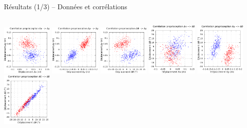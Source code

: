 \begin{frame}{Résultats (1/3) -- Données et corrélations}
\begin{columns}
\begin{column}{0.65\linewidth}
            \newline
            \includegraphics[type=pdf,ext=.pdf,read=.pdf,width=2.5cm]{../plot/OdometryLWPR/grass_close_function_read_x_y}
            \includegraphics[type=pdf,ext=.pdf,read=.pdf,width=2.5cm]{../plot/OdometryLWPR/grass_close_function_read_y_y}
            \includegraphics[type=pdf,ext=.pdf,read=.pdf,width=2.5cm]{../plot/OdometryLWPR/grass_close_function_read_yaw_y}
            \vspace{0.2cm}
            \newline
            \includegraphics[type=pdf,ext=.pdf,read=.pdf,width=2.5cm]{../plot/OdometryLWPR/grass_close_function_read_x_yaw}
            \includegraphics[type=pdf,ext=.pdf,read=.pdf,width=2.5cm]{../plot/OdometryLWPR/grass_close_function_read_y_yaw}
            \includegraphics[type=pdf,ext=.pdf,read=.pdf,width=2.5cm]{../plot/OdometryLWPR/grass_close_function_read_yaw_yaw}
        \end{column}
    \end{columns}
\end{frame}

